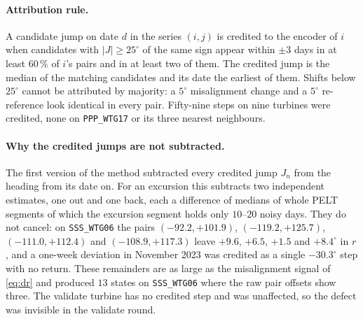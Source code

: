 \documentclass[11pt,a4paper]{article}
\theoremstyle{remark}
\newcommand{\dg}{^{\circ}}
\newcommand{\code}[1]{\texttt{#1}}
\begin{document}
\paragraph{Attribution rule.} A candidate jump on date $d$ in the series
$(i,j)$ is credited to the encoder of $i$ when candidates with $|J|\ge25\dg$ of
the same sign appear within $\pm3$ days in at least $60\,\%$ of $i$'s pairs and
in at least two of them. The credited jump is the median of the matching
candidates and its date the earliest of them. Shifts below $25\dg$ cannot be
attributed by majority: a $5\dg$ misalignment change and a $5\dg$
re-reference look identical in every pair. Fifty-nine steps on nine turbines
were credited, none on \code{PPP\_WTG17} or its three nearest neighbours.

\paragraph{Why the credited jumps are not subtracted.} The first version of
the method subtracted every credited jump $J_n$ from the heading from its date
on. For an excursion this subtracts two independent estimates, one out and one
back, each a difference of medians of whole PELT segments of which the
excursion segment holds only $10$--$20$ noisy days. They do not cancel: on
\code{SSS\_WTG06} the pairs $(-92.2,+101.9)$, $(-119.2,+125.7)$,
$(-111.0,+112.4)$ and $(-108.9,+117.3)$ leave $+9.6$, $+6.5$, $+1.5$ and
$+8.4\dg$ in $r$, and a one-week deviation in November 2023 was credited as a
single $-30.3\dg$ step with no return. These remainders are as large as the
misalignment signal of \eqref{eq:dr} and produced $13$ states on
\code{SSS\_WTG06} where the raw pair offsets show three. The validate turbine
has no credited step and was unaffected, so the defect was invisible in the
validate round.
\end{document}
